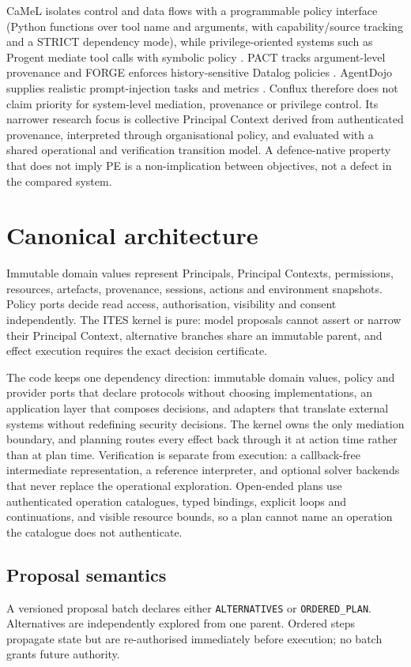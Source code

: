 \documentclass[11pt]{article}
\begin{document}
CaMeL isolates control and data flows with a programmable policy interface
(Python functions over tool name and arguments, with capability/source
tracking and a STRICT dependency mode), while privilege-oriented systems such as
Progent mediate tool calls with symbolic policy \citep{camel,progent}. PACT
tracks argument-level provenance and FORGE enforces history-sensitive Datalog
policies \citep{pact,forge}. AgentDojo supplies realistic prompt-injection tasks
and metrics \citep{agentdojo}. Conflux therefore does not claim priority for
system-level mediation, provenance or privilege control. Its narrower research
focus is collective Principal Context derived from authenticated provenance,
interpreted through organisational policy, and evaluated with a shared
operational and verification transition model. A defence-native property that
does not imply PE is a non-implication between objectives, not a defect in the
compared system.

\section{Canonical architecture}
Immutable domain values represent Principals, Principal Contexts, permissions,
resources, artefacts, provenance, sessions, actions and environment snapshots.
Policy ports decide read access, authorisation, visibility and consent
independently. The ITES kernel is pure: model proposals cannot assert or narrow
their Principal Context, alternative branches share an immutable parent, and
effect execution requires the exact decision certificate.

The code keeps one dependency direction: immutable domain values, policy and
provider ports that declare protocols without choosing implementations, an
application layer that composes decisions, and adapters that translate external
systems without redefining security decisions. The kernel owns the only
mediation boundary, and planning routes every effect back through it at action
time rather than at plan time. Verification is separate from execution: a
callback-free intermediate representation, a reference interpreter, and optional
solver backends that never replace the operational exploration. Open-ended plans
use authenticated operation catalogues, typed bindings, explicit loops and
continuations, and visible resource bounds, so a plan cannot name an operation
the catalogue does not authenticate.

\subsection{Proposal semantics}
A versioned proposal batch declares either \texttt{ALTERNATIVES} or
\texttt{ORDERED\_PLAN}. Alternatives are independently explored from one
parent. Ordered steps propagate state but are re-authorised immediately before
execution; no batch grants future authority.
\end{document}
